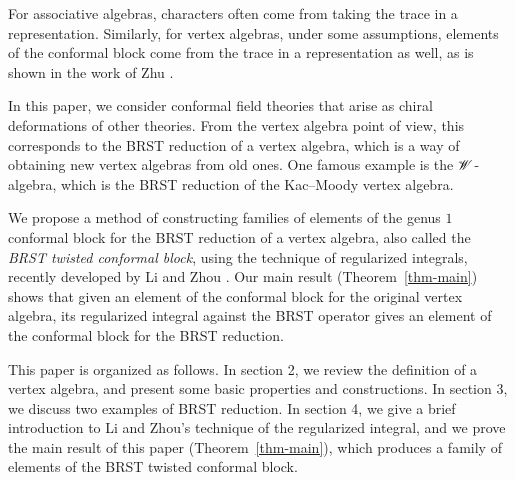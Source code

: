 For associative algebras,
characters often come from taking the trace in a representation.
Similarly, for vertex algebras,
under some assumptions,
elements of the conformal block come from the trace in a representation as well,
as is shown in the work of Zhu \cite{zhu}.

In this paper, we consider conformal field theories
that arise as chiral deformations of other theories.
From the vertex algebra point of view,
this corresponds to the BRST reduction of a vertex algebra,
which is a way of obtaining new vertex algebras from old ones.
One famous example is the $\mathscr{W}$-algebra,
which is the BRST reduction of the Kac--Moody vertex algebra.

We propose a method of constructing families of elements
of the genus $1$ conformal block
for the BRST reduction of a vertex algebra,
also called the \emph{BRST twisted conformal block},
using the technique of regularized integrals,
recently developed by Li and Zhou \cite{regularized}.
Our main result (Theorem~\ref{thm-main}) shows that
given an element of the conformal block for the original vertex algebra,
its regularized integral against the BRST operator
gives an element of the conformal block
for the BRST reduction.

This paper is organized as follows.
In section 2, we review the definition of a vertex algebra,
and present some basic properties and constructions.
In section 3, we discuss two examples of BRST reduction.
In section 4, we give a brief introduction to Li and Zhou's technique
of the regularized integral, and we prove the main result of this paper (Theorem~\ref{thm-main}),
which produces a family of elements of the BRST twisted conformal block.
